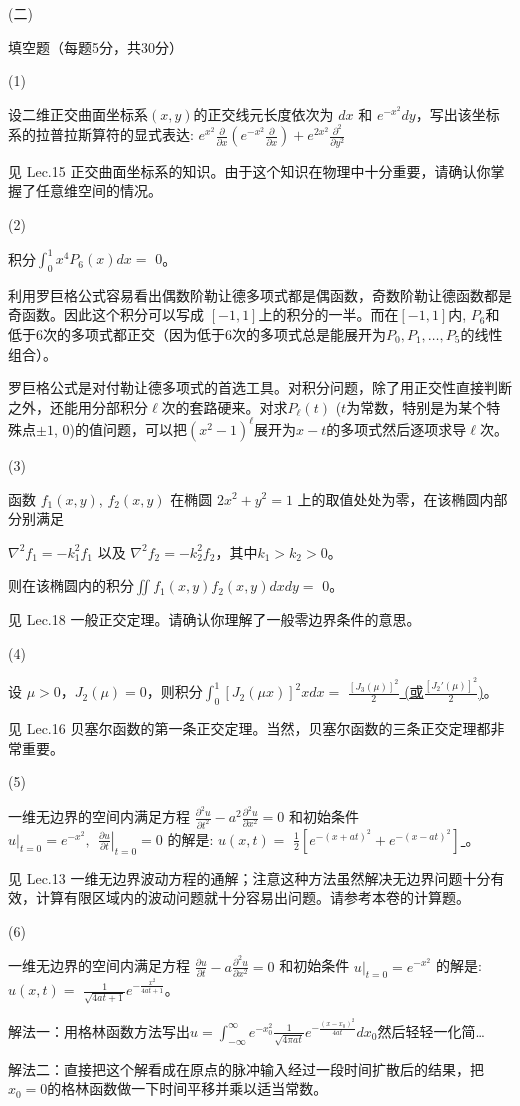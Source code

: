 \documentclass[12pt,CJK]{article}
\begin{document}
\item[(二)]{填空题（每题5分，共30分）
  \bitem
\item[(1)]{设二维正交曲面坐标系$(x,y)$的正交线元长度依次为 $dx$ 和 $e^{-x^2}dy$，写出该坐标系的拉普拉斯算符的显式表达: \underline{ \blue $e^{x^2}\frac{\partial}{\partial x}\left(e^{-x^2}\frac{\partial}{\partial x}\right) + e^{2x^2}\frac{\partial^2}{\partial y^2}$}

{\red 见 Lec.15 正交曲面坐标系的知识。由于这个知识在物理中十分重要，请确认你掌握了任意维空间的情况。}
}
\item[(2)]{积分$\int_0^1 x^4 P_6(x) dx = $ \underline{\blue $0$}。

  {\red 利用罗巨格公式容易看出偶数阶勒让德多项式都是偶函数，奇数阶勒让德函数都是奇函数。因此这个积分可以写成 $[-1,1]$上的积分的一半。而在$[-1,1]$内, $P_6$和低于6次的多项式都正交（因为低于6次的多项式总是能展开为$P_0,P_1,\ldots, P_5$的线性组合）。

    \skipline
    
    罗巨格公式是对付勒让德多项式的首选工具。对积分问题，除了用正交性直接判断之外，还能用分部积分$\ell$次的套路硬来。对求$P_\ell(t)$ ($t$为常数，特别是为某个特殊点$\pm 1$, $0$)的值问题，可以把$(x^2-1)^\ell$展开为$x-t$的多项式然后逐项求导$\ell$次。
  }
}
\item[(3)]{函数 $f_1(x,y)$, $f_2(x,y)$ 在椭圆 $2x^2+ y^2 = 1$ 上的取值处处为零，在该椭圆内部分别满足

  $ \nabla^2 f_1 =-k_1^2f_1$ 以及 $\nabla^2 f_2 = -k_2^2f_2$，其中$k_1>k_2>0$。

  则在该椭圆内的积分$\iint f_1(x,y)f_2(x,y) dx dy = $ \underline{\blue $0$}。


  {\red 见 Lec.18 一般正交定理。请确认你理解了一般零边界条件的意思。}
}
\item[(4)]{设 $\mu>0$，$J_2(\mu)=0$，则积分$\int_0^1\left[J_2(\mu x)\right]^2 x dx =$ \underline{\blue $\frac{\left[J_3(\mu)\right]^2}{2}$ (或$\frac{\left[J_2'(\mu)\right]^2}{2}$)}。

  {\red 见 Lec.16 贝塞尔函数的第一条正交定理。当然，贝塞尔函数的三条正交定理都非常重要。}
}  
\item[(5)]{一维无边界的空间内满足方程 $\frac{\partial^2u}{\partial t^2}-a^2\frac{\partial^2u}{\partial x^2} = 0$ 和初始条件  $\left.u\right\vert_{t=0} = e^{-x^2},\ \ \left.\frac{\partial u}{\partial t}\right\vert_{t=0} = 0$ 的解是: $u(x,t)=$ \underline{\blue $\frac{1}{2}\left[e^{-(x+at)^2}+e^{-(x-at)^2}\right]$ }。

{\red 见 Lec.13 一维无边界波动方程的通解；注意这种方法虽然解决无边界问题十分有效，计算有限区域内的波动问题就十分容易出问题。请参考本卷的计算题。}
}
\item[(6)]{一维无边界的空间内满足方程 $\frac{\partial u}{\partial t}-a\frac{\partial^2u}{\partial x^2} = 0$ 和初始条件  $\left.u\right\vert_{t=0} = e^{-x^2}$ 的解是: $u(x,t)=$ \underline{\blue $\frac{1}{\sqrt{4at+1}}e^{-\frac{x^2}{4at+1}}$}。

  {\red 解法一：用格林函数方法写出$u = \int_{-\infty}^\infty e^{-x_0^2} \frac{1}{\sqrt{4\pi at}} e^{-\frac{(x-x_0)^2}{4at}} dx_0$然后轻轻一化简…

    解法二：直接把这个解看成在原点的脉冲输入经过一段时间扩散后的结果，把$x_0=0$的格林函数做一下时间平移并乘以适当常数。}}

  \eitem
}
\end{document}
